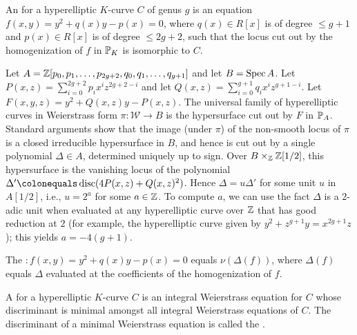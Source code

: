 \begin{defin}
 An {} for a hyperelliptic $K$-curve $C$ of genus $g$ is an equation $f(x,y) = y^2+q(x)y-p(x) = 0$, where $q(x) \in R[x]$ is of degree $\leq g+1$ and $p(x) \in R[x]$ is of degree $\leq 2g+2$, such that the locus cut out by the homogenization of $f$ in $\P_K$ is isomorphic to $C$.
\end{defin}

 Let $A = \Z[p_0,p_1,\ldots,p_{2g+2},q_0,q_1,\ldots,q_{g+1}]$ and let $B = \Spec A$. Let $P(x,z) = \sum_{i=0}^{2g+2}p_ix^iz^{2g+2-i}$ and let $Q(x,z) = \sum_{i=0}^{g+1}q_ix^iz^{g+1-i}$. Let $F(x,y,z)=y^2+Q(x,z)y-P(x,z)$. The universal family of hyperelliptic curves in Weierstrass form $\pi \colon \mathscr{W} \rightarrow B$ is the hypersurface cut out by $F$ in $\P_A$. Standard arguments show that the image (under $\pi$) of the non-smooth locus of $\pi$ is a closed irreducible hypersurface in $B$, and hence is cut out by a single polynomial $\Delta \in A$, determined uniquely up to sign. Over $B \times_{\Z} \Z[1/2]$, this hypersurface is the vanishing locus of the polynomial $\Delta' \colonequals \disc (4P(x,z)+Q(x,z)^2)$. Hence $\Delta = u \Delta'$ for some unit $u$ in $A[1/2]$, i.e., $u = 2^a$ for some $a \in \Z$. To compute $a$, we can use the fact $\Delta$ is a $2$-adic unit when evaluated at any hyperelliptic curve over $\Z$ that has good reduction at $2$ (for example, the hyperelliptic curve given by 
$y^2 + z^{g+1} y = x^{2g+1} z$); this yields $a = -4(g+1)$.

\begin{defin}
 The {} $\colon f(x,y) = y^2+q(x)y-p(x) = 0$ equals $\nu(\Delta(f))$, where $\Delta(f)$ equals $\Delta$ evaluated at the coefficients of the homogenization of $f$.
\end{defin}

\begin{defin}\label{mindisdef}\cite[Definition~3, Remarque~4]{liuminmod}
 A {} for a hyperelliptic $K$-curve $C$ is an integral Weierstrass equation for $C$ whose discriminant is minimal amongst all integral Weierstrass equations of $C$. The discriminant of a minimal Weierstrass equation is called the {}.
\end{defin}


